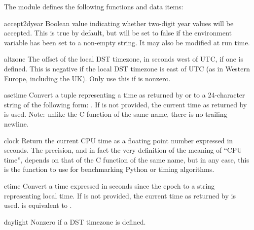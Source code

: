 The module defines the following functions and data items:


\begin{datadesc}{accept2dyear}
Boolean value indicating whether two-digit year values will be
accepted.  This is true by default, but will be set to false if the
environment variable  has been set to a non-empty
string.  It may also be modified at run time.
\end{datadesc}

\begin{datadesc}{altzone}
The offset of the local DST timezone, in seconds west of UTC, if one
is defined.  This is negative if the local DST timezone is east of UTC
(as in Western Europe, including the UK).  Only use this if
 is nonzero.
\end{datadesc}

\begin{funcdesc}{asctime}{}
Convert a tuple representing a time as returned by 
or  to a 24-character string of the following form:
.  If  is not provided, the
current time as returned by  is used.  Note: unlike
the C function of the same name, there is no trailing newline.
\end{funcdesc}

\begin{funcdesc}{clock}{}
Return the current CPU time as a floating point number expressed in
seconds.  The precision, and in fact the very definition of the meaning
of ``CPU time'', depends on that of the C function
of the same name, but in any case, this is the function to use for
benchmarking Python or timing algorithms.
\end{funcdesc}

\begin{funcdesc}{ctime}{}
Convert a time expressed in seconds since the epoch to a string
representing local time. If  is not provided, the current time
as returned by  is used.  
is equivalent to .
\end{funcdesc}

\begin{datadesc}{daylight}
Nonzero if a DST timezone is defined.
\end{datadesc}

